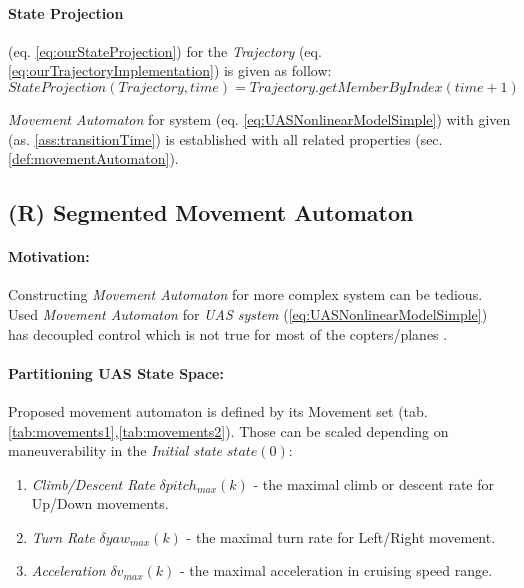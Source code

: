 \paragraph{State Projection} (eq. \ref{eq:ourStateProjection}) for the \emph{Trajectory} (eq. \ref{eq:ourTrajectoryImplementation}) is given as follow:
\begin{equation}\label{eq:ourStateProjection}
    StateProjection(Trajectory,time) = Trajectory.getMemberByIndex(time+1)
\end{equation}

\begin{note}
    \emph{Movement Automaton} for system (eq. \ref{eq:UASNonlinearModelSimple}) with given (as. \ref{ass:transitionTime}) is established with all related properties (sec. \ref{def:movementAutomaton}).
\end{note}

\subsection{(R) Segmented Movement Automaton}\label{s:segmentedMovementAutomaton}
\paragraph{Motivation:} Constructing \emph{Movement Automaton} for more complex system can be tedious. Used \emph{Movement Automaton} for \emph{UAS system} (\ref{eq:UASNonlinearModelSimple}) has decoupled control which is not true for most of the copters/planes \cite{fossen2011mathematical}.

\paragraph{Partitioning UAS State Space:} Proposed movement automaton is defined by its Movement set (tab. \ref{tab:movements1},\ref{tab:movements2}). Those can be scaled depending on maneuverability in the  \emph{Initial state} $state(0)$:
\begin{enumerate}
    \item \emph{Climb/Descent Rate} $\delta pitch_{max}(k)$ - the maximal climb or descent rate for Up/Down movements.
    \item \emph{Turn Rate} $\delta yaw_{max}(k)$ - the maximal turn rate for Left/Right movement.
    \item \emph{Acceleration} $\delta v_{max}(k)$ - the maximal acceleration in cruising speed range.
\end{enumerate}

